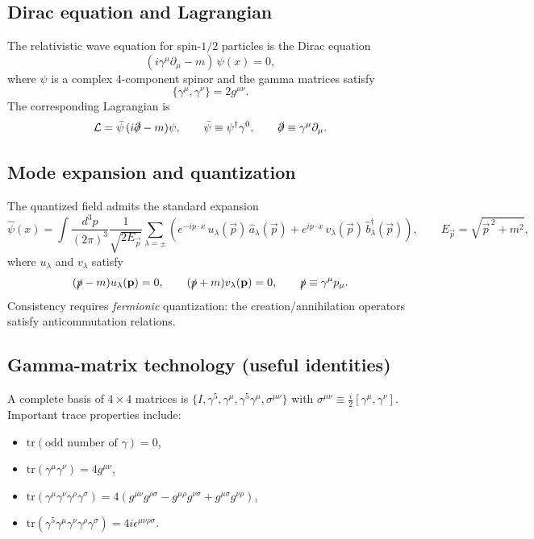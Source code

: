 \subsection{Dirac equation and Lagrangian}
The relativistic wave equation for spin-$1/2$ particles is the Dirac equation
\begin{equation}
(i\gamma^\mu\partial_\mu - m)\,\psi(x)=0,
\end{equation}
where $\psi$ is a complex 4-component spinor and the gamma matrices satisfy
\begin{equation}
\{\gamma^\mu,\gamma^\nu\}=2g^{\mu\nu}.
\end{equation}
The corresponding Lagrangian is
\begin{equation}
\mathcal L=\bar\psi\,(i\slashed{\partial}-m)\psi,
\qquad
\bar\psi\equiv \psi^\dagger\gamma^0,\qquad
\slashed{\partial}\equiv \gamma^\mu\partial_\mu.
\end{equation}

\subsection{Mode expansion and quantization}
The quantized field admits the standard expansion
\begin{equation}
\hat\psi(x)=\int\frac{d^3p}{(2\pi)^3}\frac{1}{\sqrt{2E_{\vec p}}}
\sum_{\lambda=\pm}\left(
e^{-ip\cdot x}\,u_\lambda(\vec p)\,\hat a_\lambda(\vec p)
+
e^{ip\cdot x}\,v_\lambda(\vec p)\,\hat b^\dagger_\lambda(\vec p)
\right),
\qquad
E_{\vec p}=\sqrt{\vec p^{\,2}+m^2},
\end{equation}
where $u_\lambda$ and $v_\lambda$ satisfy
\begin{equation}
(\slashed{p}-m)u_\lambda(\vec p)=0,\qquad (\slashed{p}+m)v_\lambda(\vec p)=0,\qquad \slashed{p}\equiv \gamma^\mu p_\mu.
\end{equation}
Consistency requires \emph{fermionic} quantization: the creation/annihilation operators satisfy anticommutation relations.

\subsection{Gamma-matrix technology (useful identities)}
A complete basis of $4\times4$ matrices is $\{I,\gamma^5,\gamma^\mu,\gamma^5\gamma^\mu,\sigma^{\mu\nu}\}$ with
$\sigma^{\mu\nu}\equiv \frac{i}{2}[\gamma^\mu,\gamma^\nu]$.
Important trace properties include:
\begin{itemize}
  \item $\mathrm{tr}(\text{odd number of }\gamma)=0$,
  \item $\mathrm{tr}(\gamma^\mu\gamma^\nu)=4g^{\mu\nu}$,
  \item $\mathrm{tr}(\gamma^\mu\gamma^\nu\gamma^\rho\gamma^\sigma)
  =4(g^{\mu\nu}g^{\rho\sigma}-g^{\mu\rho}g^{\nu\sigma}+g^{\mu\sigma}g^{\nu\rho})$,
  \item $\mathrm{tr}(\gamma^5\gamma^\mu\gamma^\nu\gamma^\rho\gamma^\sigma)=4i\epsilon^{\mu\nu\rho\sigma}$.
\end{itemize}

